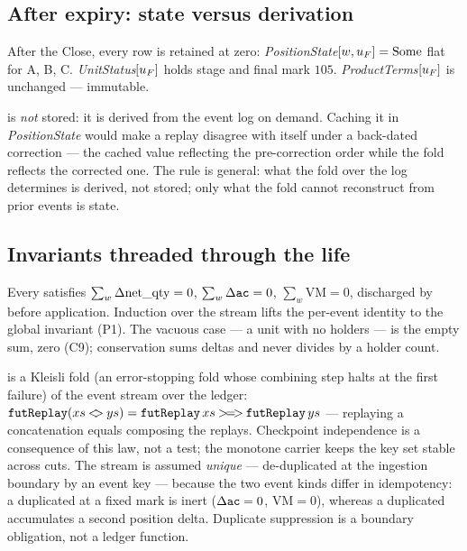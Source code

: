 \subsection{After expiry: state versus derivation}

After the Close, every row is retained at zero: \emph{PositionState}$[w,u_{F}]=\mathrm{Some}$ flat for
A, B, C. \emph{UnitStatus}$[u_{F}]$ holds stage  and final mark $105$.
\emph{ProductTerms}$[u_{F}]$ is unchanged --- immutable.

 is \emph{not} stored: it is derived from the event log on demand. Caching it
in \emph{PositionState} would make a replay disagree with itself under a back-dated correction --- the
cached value reflecting the pre-correction order while the fold reflects the corrected one. The rule
is general: what the fold over the log determines is derived, not stored; only what the fold cannot
reconstruct from prior events is state.

\subsection{Invariants threaded through the life}
\label{sec:futures-invariants}

\begin{invariant}
Every  satisfies $\sum_w\Delta\mathrm{net\_qty}=0$, $\sum_w\Delta\texttt{ac}=0$, $\sum_w\mathrm{VM}=0$,
discharged by  before application. Induction over the stream lifts the per-event
identity to the global invariant (P1). The vacuous case --- a unit with no holders --- is the empty
sum, zero (C9); conservation sums deltas and never divides by a holder count.
\end{invariant}

\begin{invariant}
 is a Kleisli fold (an error-stopping fold whose combining step halts at the first failure) of the event stream over the ledger:
$\texttt{futReplay}(xs\mathbin{<\!\!>}ys)=\texttt{futReplay}\,xs \mathbin{>\!=\!>} \texttt{futReplay}\,ys$ ---
replaying a concatenation equals composing the replays. Checkpoint independence is a consequence of
this law, not a test; the monotone carrier keeps the key set stable across cuts. The stream is assumed
\emph{unique} --- de-duplicated at the ingestion boundary by an event key --- because the two event
kinds differ in idempotency: a duplicated  at a fixed mark is inert ($\Delta\texttt{ac}=0$,
$\mathrm{VM}=0$), whereas a duplicated  accumulates a second position delta. Duplicate
suppression is a boundary obligation, not a ledger function.
\end{invariant}

